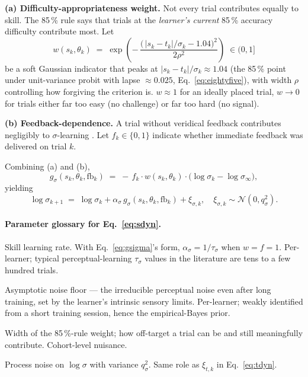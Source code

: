 \documentclass[11pt]{article}
\begin{document}
\smallskip\noindent\textbf{(a) Difficulty-appropriateness weight.}
Not every trial contributes equally to skill. The 85\,\% rule
\citep{wilson202085percent} says that trials at the \emph{learner's
current} 85\,\% accuracy difficulty contribute most. Let
\begin{equation}
  w(s_k, \theta_k) \;=\;
    \exp\!\left(-\,
      \frac{\bigl(\,|s_k - t_k|/\sigma_k - 1.04\bigr)^2}{2\rho^2}
    \right)
  \;\in (0, 1]
  \label{eq:weight}
\end{equation}
be a soft Gaussian indicator that peaks at $|s_k - t_k|/\sigma_k
\approx 1.04$ (the 85\,\% point under unit-variance probit with
lapse $\approx 0.025$, Eq.~\ref{eq:eightyfive}), with width $\rho$
controlling how forgiving the criterion is. $w \approx 1$ for an
ideally placed trial, $w \to 0$ for trials either far too easy (no
challenge) or far too hard (no signal).

\smallskip\noindent\textbf{(b) Feedback-dependence.}
A trial without veridical feedback contributes negligibly to
$\sigma$-learning \citep{aberg2012feedback}. Let
$f_k \in \{0, 1\}$ indicate whether immediate feedback was delivered
on trial $k$.

\smallskip\noindent Combining (a) and (b),
\begin{equation}
  g_\sigma(s_k, \theta_k, \mathrm{fb}_k)
  \;=\; -\,f_k \cdot w(s_k, \theta_k) \cdot
        \bigl(\log\sigma_k - \log\sigma_\infty\bigr),
  \label{eq:gsigma}
\end{equation}
yielding
\begin{equation}
  \boxed{\;
    \log\sigma_{k+1} \;=\; \log\sigma_k + \alpha_\sigma\,
      g_\sigma(s_k, \theta_k, \mathrm{fb}_k) + \xi_{\sigma,k},
    \quad \xi_{\sigma,k} \sim \mathcal{N}(0, q_\sigma^2).
  \;}
  \label{eq:sdyn}
\end{equation}

\paragraph{Parameter glossary for Eq.~\ref{eq:sdyn}.}
\begin{description}[leftmargin=2.2em,style=nextline,itemsep=1pt]
  \item[$\alpha_\sigma \ge 0$.] Skill learning rate. With
    Eq.~\ref{eq:gsigma}'s form, $\alpha_\sigma = 1/\tau_\sigma$ when
    $w = f = 1$. Per-learner; typical perceptual-learning $\tau_\sigma$
    values in the literature are tens to a few hundred trials.
  \item[$\sigma_\infty$.] Asymptotic noise floor — the irreducible
    perceptual noise even after long training, set by the learner's
    intrinsic sensory limits. Per-learner; weakly identified from a
    short training session, hence the empirical-Bayes prior.
  \item[$\rho$.] Width of the 85\,\%-rule weight; how off-target a
    trial can be and still meaningfully contribute. Cohort-level
    nuisance.
  \item[$\xi_{\sigma,k}$.] Process noise on $\log \sigma$ with
    variance $q_\sigma^2$. Same role as $\xi_{t,k}$ in
    Eq.~\ref{eq:tdyn}.
\end{description}
\end{document}
